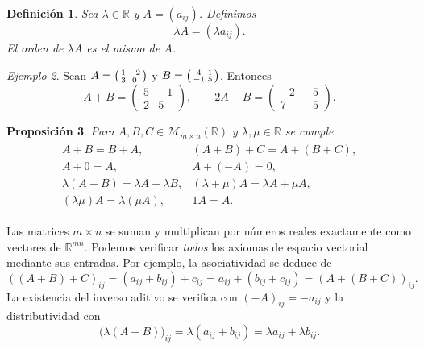 \documentclass[12pt]{article}
\newtheorem{definicion}{Definición}[section]
\newtheorem{proposicion}[definicion]{Proposición}
\theoremstyle{remark}
\newtheorem{ejemplo}[definicion]{Ejemplo}
\newcommand{\R}{\mathbb{R}}
\newcommand{\Mat}[2]{\mathcal{M}_{#1\times #2}}
\begin{document}
\begin{definicion}
Sea $\lambda\in\R$ y $A=(a_{ij})$. Definimos
\[
\lambda A=(\lambda a_{ij}).
\]
El orden de $\lambda A$ es el mismo de $A$.
\end{definicion}

\begin{ejemplo}
Sean $A=\begin{psmallmatrix}1&-2\\3&0\end{psmallmatrix}$ y $B=\begin{psmallmatrix}4&1\\-1&5\end{psmallmatrix}$. Entonces
\[
A+B=\begin{pmatrix}5&-1\\2&5\end{pmatrix},\qquad
2A-B=\begin{pmatrix}-2&-5\\7&-5\end{pmatrix}.
\]
\end{ejemplo}

\begin{proposicion}
Para $A,B,C\in\Mat{m}{n}(\R)$ y $\lambda,\mu\in\R$ se cumple
\begin{eqnarray*}
\begin{array}{ll}
A+B=B+A,& (A+B)+C=A+(B+C),\\
A+0=A,& A+(-A)=0,\\
\lambda(A+B)=\lambda A+\lambda B,& (\lambda+\mu)A=\lambda A+\mu A,\\
(\lambda\mu)A=\lambda(\mu A),&1A=A.
\end{array}
\end{eqnarray*}

\end{proposicion}

Las matrices $m\times n$ se suman y multiplican por números reales exactamente como vectores de $\R^{mn}$. Podemos verificar \emph{todos} los axiomas de espacio vectorial mediante sus entradas. Por ejemplo, la asociatividad se deduce de
\[
((A+B)+C)_{ij}=(a_{ij}+b_{ij})+c_{ij}=a_{ij}+(b_{ij}+c_{ij})=(A+(B+C))_{ij}.
\]
La existencia del inverso aditivo se verifica con $(-A)_{ij}=-a_{ij}$ y la distributividad con
\[
\bigl(\lambda(A+B)\bigr)_{ij}=\lambda(a_{ij}+b_{ij})=\lambda a_{ij}+\lambda b_{ij}.
\]
\end{document}
